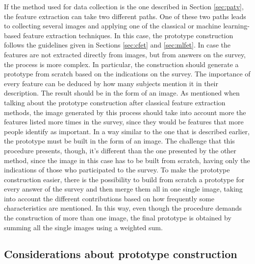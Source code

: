 \documentclass[conference]{IEEEtran}
\begin{document}
			\noindent If the method used for data collection is the one described in Section \ref{sec:patv}, the feature extraction can take two different paths. One of these two paths leads to collecting 
			several images and applying one of the classical or machine learning-based feature extraction techniques. In this case, the prototype construction follows the guidelines given in Sections \ref{sec:cfet} and \ref{sec:mlfet}.
			In case the features are not extracted directly from images, but from answers on the survey, the process is more complex. In particular, the construction should generate a prototype from 
			scratch based on the indications on the survey. The importance of every feature can be deduced by how many subjects mention it in their description. The result should be in the form of an image. 
			As mentioned when talking about the prototype construction after classical feature extraction methods, the image generated by this process should take into account more the features listed more 
			times in the survey, since they would be features that more people identify as important. In a way similar to the one that is described earlier, the prototype must be built in the form of an image. 
			The challenge that this procedure presents, though, it's different than the one presented by the other method, since the image in this case has to be built from scratch, having only the indications of 
			those who participated to the survey. To make the prototype construction easier, there is the possibility to build from scratch a prototype for every answer of the survey and then merge them all in one 
			single image, taking into account the different contributions based on how frequently some characteristics are mentioned. In this way, even though the procedure demands the construction of more than one 
			image, the final prototype is obtained by summing all the single images using a weighted sum.
		 
		
		\subsection{Considerations about prototype construction\label{sec:cpc}}
		
\end{document}
